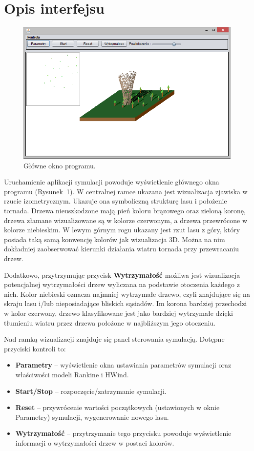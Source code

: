 \section{Opis interfejsu}

\begin{figure}[!h]
	\center
	\includegraphics[scale=0.75]{gui_main}
	\caption{Główne okno programu.}
	\label{fig:gui_main}
\end{figure} 

Uruchamienie aplikacji symulacji powoduje wyświetlenie głównego okna programu (Rysunek~\ref{fig:gui_main}). W centralnej ramce ukazana jest wizualizacja zjawiska w rzucie izometrycznym. Ukazuje ona symboliczną strukturę lasu i położenie tornada. Drzewa nieuszkodzone mają pień koloru brązowego oraz zieloną koronę, drzewa złamane wizualizowane są w kolorze czerwonym, a drzewa przewrócone w kolorze niebieskim. W lewym górnym rogu ukazany jest rzut lasu z góry, który posiada taką samą konwencję kolorów jak wizualizacja 3D. Można na nim dokładniej zaobserwować kierunki działania wiatru tornada przy przewracaniu drzew.

Dodatkowo, przytrzymując przycisk \textbf{Wytrzymałość} możliwa jest wizualizacja potencjalnej wytrzymałości drzew wyliczana na podstawie otoczenia każdego z nich. Kolor niebieski oznacza najmniej wytrzymałe drzewo, czyli znajdujące się na skraju lasu i/lub nieposiadające bliskich sąsiadów. Im korona bardziej przechodzi w kolor czerwony, drzewo klasyfikowane jest jako bardziej wytrzymałe dzięki tłumieniu wiatru przez drzewa położone w najbliższym jego otoczeniu.

 Nad ramką wizualizacji znajduje się panel sterowania symulacją. Dotępne przyciski kontroli to:

\begin{itemize}
\item \textbf{Parametry} -- wyświetlenie okna ustawiania parametrów symulacji oraz właściwości modeli Rankine i HWind.
\item \textbf{Start/Stop} -- rozpoczęcie/zatrzymanie symulacji.
\item \textbf{Reset} -- przywrócenie wartości początkowych (ustawionych w oknie Parametry) symulacji, wygenerowanie nowego lasu.
\item \textbf{Wytrzymałość} -- przytrzymanie tego przycisku powoduje wyświetlenie informacji o wytrzymałości drzew w postaci kolorów.
\end{itemize}

